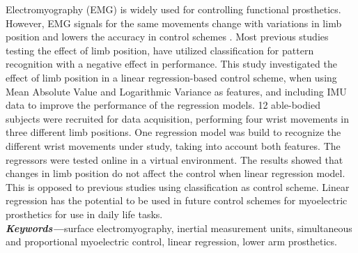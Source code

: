 Electromyography (EMG) is widely used for controlling functional prosthetics. However, EMG signals for the same movements change with variations in limb position and lowers the accuracy in control schemes \cite{fougner2012}. Most previous studies testing the effect of limb position, have utilized classification for pattern recognition with a negative effect in performance. %
This study investigated the effect of limb position in a linear regression-based control scheme, when using 
Mean Absolute Value and Logarithmic Variance as features, and including IMU data to improve the performance of the regression models.  %
12 able-bodied subjects were recruited for data acquisition, performing four wrist movements in three different limb positions. One regression model was build to recognize the different wrist movements under study, taking into account both features. %
The regressors were tested online in a virtual environment. %
The results showed that changes in limb position do not affect the control when linear regression model.
This is opposed to previous studies using classification as control scheme. Linear regression has the potential to be used in future control schemes for myoelectric prosthetics for use in daily life tasks.\\


\textit{\textbf{Keywords---}}surface electromyography, inertial measurement units, simultaneous and proportional myoelectric control, linear regression, lower arm prosthetics.

